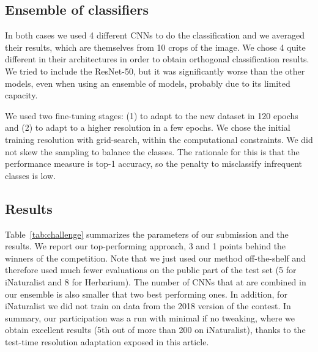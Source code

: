 \documentclass{article}
\begin{document}
\subsection{Ensemble of classifiers}

In both cases we used 4 different CNNs to do the classification and we averaged their results, which are themselves from 10 crops of the image. 
We chose 4 quite different in their architectures in order to obtain orthogonal classification results.
We tried to include the ResNet-50, but it was significantly worse than the other models, even when using an ensemble of models, probably due to its limited capacity. 

We used two fine-tuning stages: (1) to adapt to the new dataset in 120 epochs and (2) to adapt to a higher resolution in a few epochs. 
We chose the initial training resolution with grid-search, within the computational constraints. 
We did not skew the sampling to balance the classes. 
The rationale for this is that the performance measure is top-1 accuracy, so the penalty to misclassify infrequent classes is low.

\subsection{Results}

Table~\ref{tab:challenge} summarizes the parameters of our submission and the results. 
We report our top-performing approach, 3 and 1 points behind the winners of the competition. 
Note that we just used our method off-the-shelf and therefore used much fewer evaluations on the public part of the test set (5 for iNaturalist and 8 for Herbarium). 
The number of CNNs that at are combined in our ensemble is also smaller that two best performing ones.
In addition, for iNaturalist we did not train on data from the 2018 version of the contest.
In summary, our participation was a run with minimal if no tweaking, where we obtain excellent results (5th out of more than 200 on iNaturalist), thanks to the test-time resolution adaptation exposed in this article.
\end{document}
